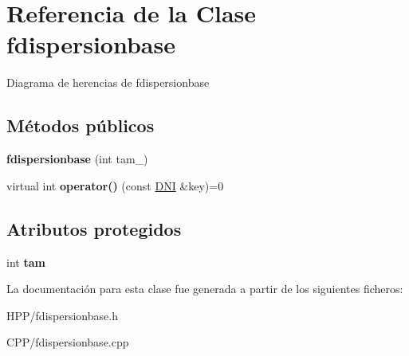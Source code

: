 \hypertarget{classfdispersionbase}{}\section{Referencia de la Clase fdispersionbase}
\label{classfdispersionbase}


Diagrama de herencias de fdispersionbase
\subsection*{Métodos públicos}
\begin{DoxyCompactItemize}
\item 
\mbox{\label{classfdispersionbase_ae9662e8ca37828bb6e7e9a28d1697217}} 
{\bfseries fdispersionbase} (int tam\+\_\+)
\item 
\mbox{\label{classfdispersionbase_a421981d7776d782be9cf68dd737df110}} 
virtual int {\bfseries operator()} (const \hyperlink{classDNI}{D\+NI} \&key)=0
\end{DoxyCompactItemize}
\subsection*{Atributos protegidos}
\begin{DoxyCompactItemize}
\item 
\mbox{\label{classfdispersionbase_adcfe0b93b0a72ecb56ee783852bb7f95}} 
int {\bfseries tam}
\end{DoxyCompactItemize}


La documentación para esta clase fue generada a partir de los siguientes ficheros\+:\begin{DoxyCompactItemize}
\item 
H\+P\+P/fdispersionbase.\+h\item 
C\+P\+P/fdispersionbase.\+cpp\end{DoxyCompactItemize}
